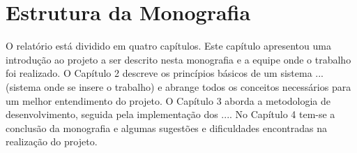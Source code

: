\section{Estrutura da Monografia}
\label{sec:organizacao}

O relatório está dividido em quatro capítulos. Este capítulo apresentou uma introdução ao projeto a ser descrito nesta monografia e a equipe onde o
trabalho foi realizado. O Capítulo 2 descreve os princípios básicos de um sistema ... (sistema onde se insere o trabalho) e abrange todos os
conceitos necessários para um melhor entendimento do projeto. O Capítulo 3 aborda a metodologia de desenvolvimento, seguida pela implementação dos
.... No Capítulo 4 tem-se a conclusão da  monografia e algumas sugestões e dificuldades encontradas na realização do projeto.

\clearpage